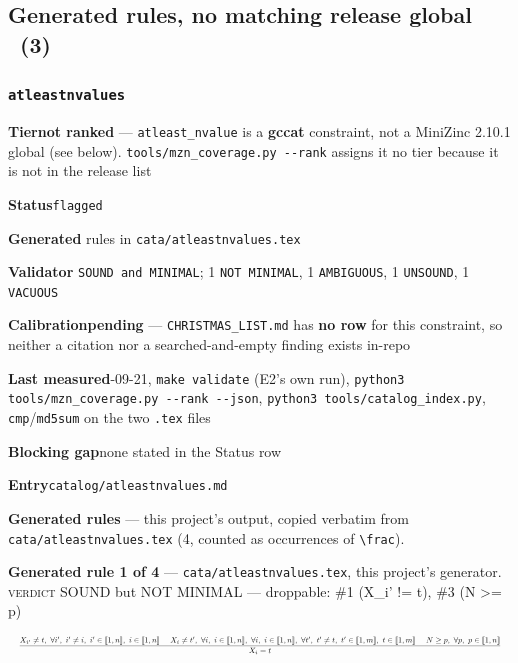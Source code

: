 \documentclass[10pt,a4paper]{article}
\newcommand{\entryfield}[2]{{\raggedright\textbf{#1}\quad #2\par}}
\newcommand{\rulebox}[1]{%
  \[\resizebox{\ifdim\width>\linewidth\linewidth\else\width\fi}{!}%
    {$\displaystyle #1$}\]}
\begin{document}
\subsection*{Generated rules, no matching release global \ \normalsize(3)}
\subsubsection*{\texttt{atleastnvalues}}
\label{entry:atleastnvalues}
\entryfield{Tier}{\textbf{not ranked} --- \texttt{atleast\_nvalue} is a \textbf{gccat} constraint, not a MiniZinc 2.10.1 global (see below). \texttt{tools/\allowbreak{}mzn\_\allowbreak{}coverage.\allowbreak{}py -\allowbreak{}-\allowbreak{}rank} assigns it no tier because it is not in the release list}
\entryfield{Status}{\texttt{flagged}}
\entryfield{Generated}{4 rules in \texttt{cata/atleastnvalues.tex}}
\entryfield{Validator}{0 \texttt{SOUND and MINIMAL}; 1 \texttt{NOT MINIMAL}, 1 \texttt{AMBIGUOUS}, 1 \texttt{UNSOUND}, 1 \texttt{VACUOUS}}
\entryfield{Calibration}{\textbf{pending} --- \texttt{CHRISTMAS\_LIST.md} has \textbf{no row} for this constraint, so neither a citation nor a searched-and-empty finding exists in-repo}
\entryfield{Last measured}{2026-09-21, \texttt{make validate} (E2's own run), \texttt{python3 tools/\allowbreak{}mzn\_\allowbreak{}coverage.\allowbreak{}py -\allowbreak{}-\allowbreak{}rank -\allowbreak{}-\allowbreak{}json}, \texttt{python3 tools/\allowbreak{}catalog\_\allowbreak{}index.\allowbreak{}py}, \texttt{cmp}/\texttt{md5sum} on the two \texttt{.tex} files}
\entryfield{Blocking gap}{none stated in the Status row}
\entryfield{Entry}{\texttt{catalog/atleastnvalues.md}}

\textbf{Generated rules} --- this project's output, copied verbatim from \texttt{cata/atleastnvalues.tex} (4, counted as occurrences of \texttt{\textbackslash{}frac}).\par

{\small\textbf{Generated rule 1 of 4} --- \texttt{cata/atleastnvalues.tex}, this project's generator. \textsc{verdict} SOUND but NOT MINIMAL --- droppable: \#1 (X\_i' != t), \#3 (N >= p)\par}
\rulebox{\frac{X_{i'} \neq t,~\forall i',~i' \neq i,~i' \in \llbracket1,n\rrbracket,~i \in \llbracket1,n\rrbracket~~~~X_{i} \neq t',~\forall i,~i \in \llbracket1,n\rrbracket,~\forall i,~i \in \llbracket1,n\rrbracket,~\forall t',~t' \neq t,~t' \in \llbracket1,m\rrbracket,~t \in \llbracket1,m\rrbracket~~~~N \geq p,~\forall p,~p \in \llbracket1,n\rrbracket}{X_{i}=t}}
\end{document}
